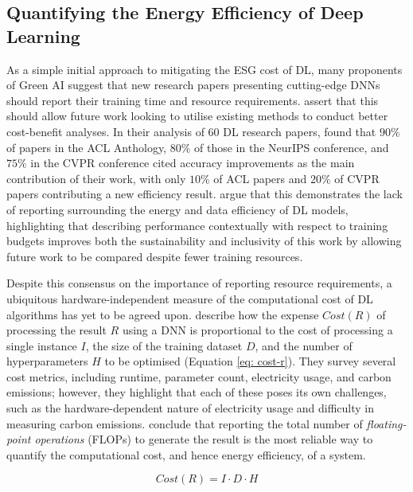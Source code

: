 \documentclass[a4paper, 11pt]{report}
\begin{document}
    \subsection{Quantifying the Energy Efficiency of Deep Learning}

    As a simple initial approach to mitigating the ESG cost of DL, many proponents of Green AI suggest that new research papers presenting cutting-edge DNNs should report their training time and resource requirements. \citet{strubell-2019} assert that this should allow future work looking to utilise existing methods to conduct better cost-benefit analyses. In their analysis of 60 DL research papers, \citet{schwartz-2019} found that $90\%$ of papers in the ACL Anthology, $80\%$ of those in the NeurIPS conference, and $75\%$ in the CVPR conference cited accuracy improvements as the main contribution of their work, with only $10\%$ of ACL papers and $20\%$ of CVPR papers contributing a new efficiency result. \citet{schwartz-2019} argue that this demonstrates the lack of reporting surrounding the energy and data efficiency of DL models, highlighting that describing performance contextually with respect to training budgets improves both the sustainability and inclusivity of this work by allowing future work to be compared despite fewer training resources.

    Despite this consensus on the importance of reporting resource requirements, a ubiquitous hardware-independent measure of the computational cost of DL algorithms has yet to be agreed upon. \citet{schwartz-2019} describe how the expense $Cost(R)$ of processing the result $R$ using a DNN is proportional to the cost of processing a single instance $I$, the size of the training dataset $D$, and the number of hyperparameters $H$ to be optimised (Equation \ref{eq: cost-r}). They survey several cost metrics, including runtime, parameter count, electricity usage, and carbon emissions; however, they highlight that each of these poses its own challenges, such as the hardware-dependent nature of electricity usage and difficulty in measuring carbon emissions. \citet{schwartz-2019} conclude that reporting the total number of \emph{floating-point operations} (FLOPs) to generate the result is the most reliable way to quantify the computational cost, and hence energy efficiency, of a system.

    \begin{equation}
        \label{eq: cost-r}
        Cost(R) = I \cdot D \cdot H
    \end{equation}
\end{document}
